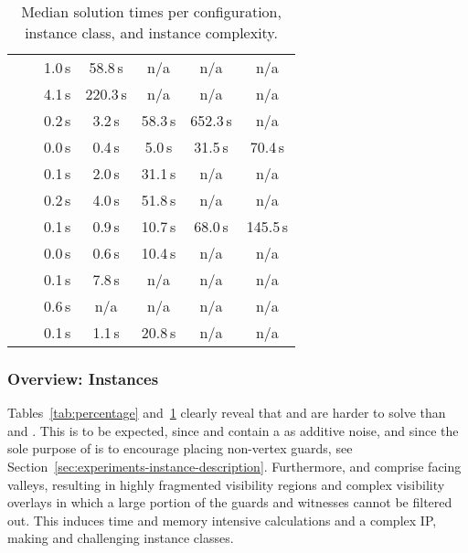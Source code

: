 \begin{table}
\begin{tabular}{|l|l|ccccc|}
			& \sinewalk       &   1.0\,s &  58.8\,s &      n/a &      n/a &      n/a \\
			& \parabolawalk   &   4.1\,s & 220.3\,s &      n/a &      n/a &      n/a \\
			& \concavevalleys &   0.2\,s &   3.2\,s &  58.3\,s & 652.3\,s &      n/a \\
		\hline
		\multirow{4}{*}{\pnodom}
			& \walk           &   0.0\,s &   0.4\,s &   5.0\,s &  31.5\,s &  70.4\,s \\
			& \sinewalk       &   0.1\,s &   2.0\,s &  31.1\,s &      n/a &      n/a \\
			& \parabolawalk   &   0.2\,s &   4.0\,s &  51.8\,s &      n/a &      n/a \\
			& \concavevalleys &   0.1\,s &   0.9\,s &  10.7\,s &  68.0\,s & 145.5\,s \\
		\hline
		\multirow{4}{*}{\pnow}
			& \walk           &   0.0\,s &   0.6\,s &  10.4\,s &      n/a &      n/a \\
			& \sinewalk       &   0.1\,s &   7.8\,s &      n/a &      n/a &      n/a \\
			& \parabolawalk   &   0.6\,s &      n/a &      n/a &      n/a &      n/a \\
			& \concavevalleys &   0.1\,s &   1.1\,s &  20.8\,s &      n/a &      n/a \\
		\hline
	\end{tabular}
	\caption{Median solution times per configuration, instance class, and instance complexity.}
	\label{tab:time}
\end{table}

\subsubsection{Overview: Instances}
\label{sec:experiments-instances}

Tables~\ref{tab:percentage} and~\ref{tab:time} clearly reveal that \sinewalk and \parabolawalk are harder to solve than \walk and \concavevalleys.
This is to be expected, since \sinewalk and \parabolawalk contain a \walk as additive noise, and since the sole purpose of \concavevalleys is to encourage placing non-vertex guards, see Section~\ref{sec:experiments-instance-description}.
Furthermore, \sinewalk and \parabolawalk comprise facing valleys, resulting in highly fragmented visibility regions and complex visibility overlays in which a large portion of the guards and witnesses cannot be filtered out.
This induces time and memory intensive calculations and a complex \ac{IP}, making \sinewalk and \parabolawalk challenging instance classes.

